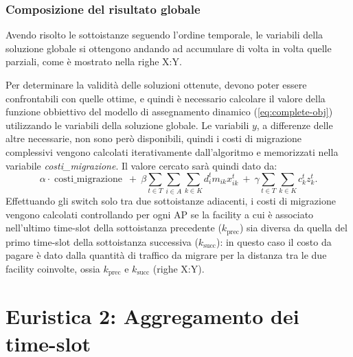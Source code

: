 \subsubsection{Composizione del risultato globale}

Avendo risolto le sottoistanze seguendo l'ordine temporale, le variabili della soluzione globale si ottengono andando ad accumulare di volta in volta quelle parziali, come è mostrato nella righe X:Y.

Per determinare la validità delle soluzioni ottenute, devono poter essere confrontabili con quelle ottime, e quindi è necessario calcolare il valore della funzione obbiettivo del modello di assegnamento dinamico (\autoref{eq:complete-obj}) utilizzando le variabili della soluzione globale. Le variabili $y$, a differenze delle altre necessarie, non sono però disponibili, quindi i costi di migrazione complessivi vengono calcolati iterativamente dall'algoritmo e memorizzati nella variabile \textit{costi\_migrazione}. Il valore cercato sarà quindi dato da:
\begin{equation}
    \alpha \cdot \operatorname{costi\_migrazione} ~ + ~ \beta \sum_{t \in T} \sum_{i \in A} \sum_{k \in K}d^{t}_{i} m_{ik} x^t_{ik} ~ + ~ \gamma \sum_{t \in T} \sum_{k \in K}{c_k^t z_k^t}.
\end{equation}
Effettuando gli switch solo tra due sottoistanze adiacenti, i costi di migrazione vengono calcolati controllando per ogni AP se la facility a cui è associato nell'ultimo time-slot della sottoistanza precedente ($k_{\text{prec}}$) sia diversa da quella del primo time-slot della sottoistanza successiva ($k_{\text{succ}}$): in questo caso il costo da pagare è dato dalla quantità di traffico da migrare per la distanza tra le due facility coinvolte, ossia $k_{\text{prec}}$ e $k_{\text{succ}}$ (righe X:Y).


%
%
\section{Euristica 2: Aggregamento dei time-slot}
\label{sec:aggregamento-time-slot}

